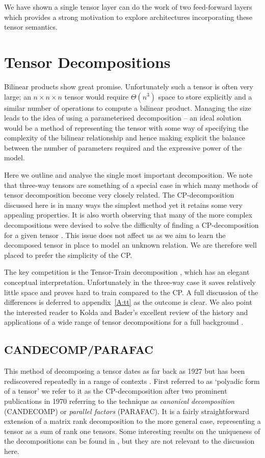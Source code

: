 We have shown a single tensor layer can do the work of two feed-forward
layers which provides a strong motivation to explore architectures incorporating these tensor
semantics.


\section{Tensor Decompositions} %
Bilinear products show great promise. Unfortunately
such a tensor is often very large; an \(n \times n \times n\) tensor
would require \(\Theta(n^3)\) space
to store explicitly and a similar number of operations to compute a bilinear product. 
Managing the size leads to the idea of using a parameterised decomposition -- an ideal solution
would be a method of representing the tensor with some way of specifying the complexity of the
bilinear relationship and hence making explicit the balance between the number of parameters
required and the expressive power of the model. 

Here we outline and analyse the single most important decomposition. We note that
three-way tensors are something of a special case in which many methods of tensor decomposition
become very closely related. The CP-decomposition discussed here is in many ways the
simplest method yet it retains some very appealing properties. It is also worth observing that
many of the
more complex decompositions were devised to solve the difficulty of finding a CP-decomposition
for a given tensor \autocite{Kolda2009, Hackbusch2009}. This issue does not affect us as we aim
to learn the decomposed tensor in place to model an unknown relation. We are therefore well placed to
prefer the simplicity of the CP. 

The key competition is the Tensor-Train decomposition
\autocite{Osedelets2011}, which has an elegant conceptual interpretation. Unfortunately in the three-way
case it saves relatively little space and proves hard to train compared to the CP. A full discussion
of the differences is deferred to appendix~\ref{A:tt} as the outcome is clear.
We also point the interested reader to Kolda and
Bader's excellent review of the history and applications of a wide range of tensor decompositions
for a full background \autocite{Kolda2009}.

\subsection{CANDECOMP/PARAFAC}
This method of decomposing a tensor dates as far back as 1927 
\autocite{Hitchcock1927, Hitchcock1928} but has been rediscovered repeatedly in a range of
contexts \autocite{Kolda2009}. First referred to as `polyadic
form of a tensor' we refer to it as the CP-decomposition after two prominent publications in
1970 referring to the technique as \emph{canonical decomposition} (CANDECOMP) \autocite{Carroll1970}
 or \emph{parallel factors} (PARAFAC). \autocite{Harshman1970}
 It is a fairly straightforward
extension of a matrix rank decomposition to the more general case, representing a tensor as
a sum of rank one tensors. Some interesting results on the uniqueness of the decompositions can be found
in \autocite{Kolda2009}, but they are not relevant to the discussion here.

